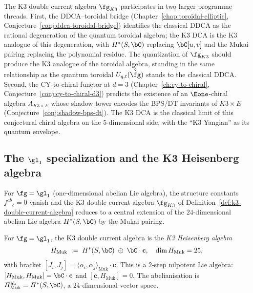 \begin{remark}
\label{rem:k3-dca-programme-connections}
The K3 double current algebra $\fg_{K3}$ participates in two
larger programme threads. First, the DDCA--toroidal bridge
(Chapter~\ref{chap:toroidal-elliptic},
Conjecture~\ref{conj:ddca-toroidal-bridge}) identifies the
classical DDCA as the rational degeneration of the quantum
toroidal algebra; the K3 DCA is the K3 analogue of this
degeneration, with $H^*(S,\bC)$ replacing $\bC[u,v]$ and the
Mukai pairing replacing the polynomial residue. The quantization
of $\fg_{K3}$ should produce the K3 analogue of the toroidal
algebra, standing in the same relationship as the quantum
toroidal $U_{q,t}(\hat{\hat{\fg}})$ stands to the classical DDCA.
Second, the CY-to-chiral functor at $d = 3$
(Chapter~\ref{ch:cy-to-chiral},
Conjecture~\ref{conj:cy-to-chiral-d3}) predicts the existence of
an $\Eone$-chiral algebra $A_{K3 \times E}$ whose shadow tower
encodes the BPS/DT invariants of $K3 \times E$
(Conjecture~\ref{conj:shadow-bps-dt}). The K3 DCA is the
classical limit of this conjectural chiral algebra on the
$5$-dimensional side, with the ``K3 Yangian'' as its quantum
envelope.
\end{remark}



\subsection{The $\gl_1$ specialization and the K3 Heisenberg algebra}
\label{subsec:k3-dca-gl1}

For $\fg = \gl_1$ (one-dimensional abelian Lie algebra), the structure
constants $f^{ab}{}_{c} = 0$ vanish and the K3 double current algebra
$\fg_{K3}$ of Definition~\ref{def:k3-double-current-algebra} reduces to
a central extension of the $24$-dimensional abelian Lie algebra
$H^*(S, \bC)$ by the Mukai pairing.

\begin{proposition}
\label{prop:k3-heisenberg}
\ClaimStatusProvedHere
For $\fg = \gl_1$, the K3 double current algebra is the
\emph{K3 Heisenberg algebra}
\[
  H_{\mathrm{Muk}} \;:=\; H^*(S, \bC) \;\oplus\; \bC \cdot \mathbf{c},
  \quad \dim H_{\mathrm{Muk}} = 25,
\]
with bracket
$[J_i, J_j] = \langle \alpha_i, \alpha_j \rangle_{\mathrm{Muk}} \cdot \mathbf{c}$.
This is a $2$-step nilpotent Lie algebra: $[H_{\mathrm{Muk}}, H_{\mathrm{Muk}}]
= \bC \cdot \mathbf{c}$ and $[\mathbf{c}, H_{\mathrm{Muk}}] = 0$.
The abelianisation is $H_{\mathrm{Muk}}^{\mathrm{ab}} = H^*(S, \bC)$,
a $24$-dimensional vector space.
\end{proposition}

